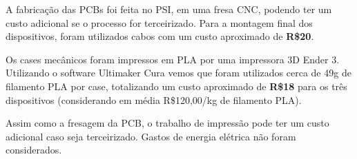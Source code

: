 \documentclass[../monografia.tex]{subfiles}
\begin{document}
A fabricação das PCBs foi feita no PSI, em uma fresa CNC, podendo ter um custo adicional se o processo for terceirizado. Para a montagem final dos dispositivos, foram utilizados cabos com um custo aproximado de \textbf{R\$20}. 

Os cases mecânicos foram impressos em PLA por uma impressora 3D Ender 3. Utilizando o software Ultimaker Cura \cite{cura} vemos que foram utilizados cerca de 49g de filamento PLA por case, totalizando um custo aproximado de \textbf{R\$18} para os três dispositivos (considerando em média R\$120,00/kg de filamento PLA). 

Assim como a fresagem da PCB, o trabalho de impressão pode ter um custo adicional caso seja terceirizado. Gastos de energia elétrica não foram considerados. 
\end{document}

